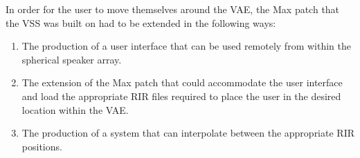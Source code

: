 \documentclass[../../main.tex]{subfiles}
\begin{document}
		




		

		In order for the user to move themselves around the \ac{VAE}, the Max patch that the \ac{VSS} was built on had to be extended in the following ways:

		\begin{enumerate}

			\item The production of a user interface that can be used remotely from within the spherical speaker array. \\

			\item The extension of the Max patch that could accommodate the user interface and load the appropriate \ac{RIR} files required to place the user in the desired location within the \ac{VAE}. \\

			\item The production of a system that can interpolate between the appropriate \ac{RIR} positions.

		\end{enumerate}
\end{document}
